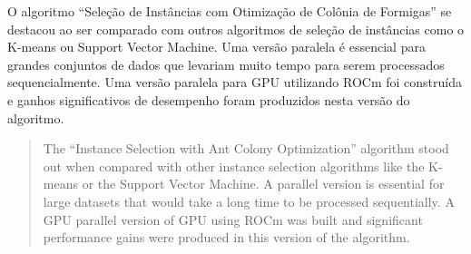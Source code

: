 \begin{resumo}
    O algoritmo ``Seleção de Instâncias com Otimização de Colônia de Formigas'' se destacou ao ser comparado com outros
    algoritmos de seleção de instâncias como o K-means ou Support Vector Machine. Uma versão paralela é essencial
    para grandes conjuntos de dados que levariam muito tempo para serem processados sequencialmente. Uma versão paralela para
    GPU utilizando ROCm foi construída e ganhos significativos de desempenho foram produzidos nesta versão do algoritmo.
\end{resumo}

\begin{abstract}
    The ``Instance Selection with Ant Colony Optimization'' algorithm stood out when compared with other instance selection algorithms
    like the {K-means} or the {Support Vector Machine}. A parallel version is essential for large datasets that
    would take a long time to be processed sequentially. A GPU parallel version of GPU using ROCm was built
    and significant performance gains were produced in this version of the algorithm.
\end{abstract}

